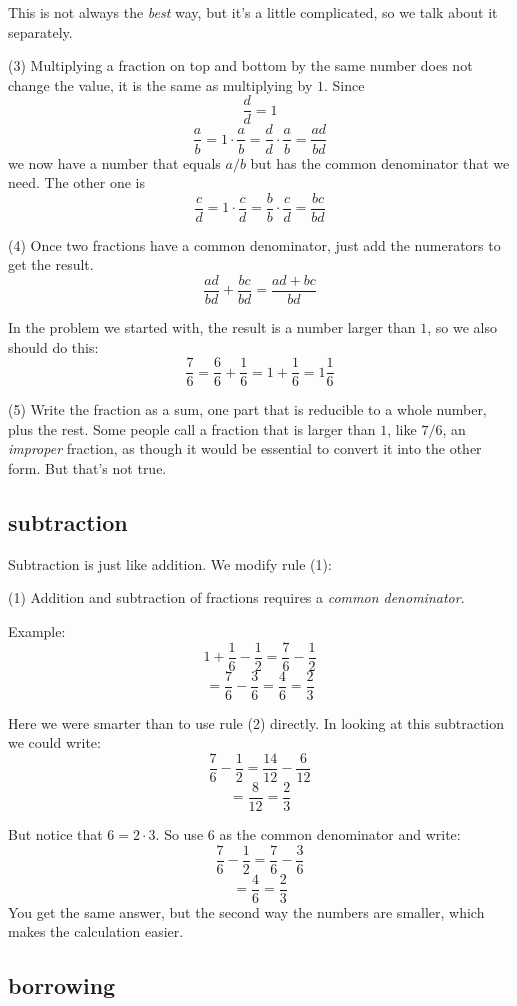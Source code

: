 \documentclass[11pt, oneside]{article}
\begin{document}
This is not always the \emph{best} way, but it's a little complicated, so we talk about it separately.

(3) Multiplying a fraction on top and bottom by the same number does not change the value, it is the same as multiplying by $1$.  Since
\[ \frac{d}{d} = 1 \]
\[ \frac{a}{b} = 1 \cdot \frac{a}{b} =\frac{d}{d} \cdot \frac{a}{b} = \frac{ad}{bd} \]
we now have a number that equals $a/b$ but has the common denominator that we need.  The other one is
\[ \frac{c}{d} = 1 \cdot \frac{c}{d} = \frac{b}{b} \cdot \frac{c}{d} = \frac{bc}{bd} \]

(4) Once two fractions have a common denominator, just add the numerators to get the result.
\[ \frac{ad}{bd} + \frac{bc}{bd} =  \frac{ad + bc}{bd} \]

In the problem we started with, the result is a number larger than $1$, so we also should do this:
\[ \frac{7}{6} = \frac{6}{6} + \frac{1}{6} = 1 + \frac{1}{6} = 1 \frac{1}{6} \]

(5) Write the fraction as a sum, one part that is reducible to a whole number, plus the rest.  Some people call a fraction that is larger than $1$, like $7/6$, an \emph{improper} fraction, as though it would be essential to convert it into the other form.  But that's not true.

\subsection*{subtraction}

Subtraction is just like addition.  We modify rule (1):

(1) Addition and subtraction of fractions requires a \emph{common denominator}.

Example:
\[ 1 + \frac{1}{6} - \frac{1}{2} = \frac{7}{6} - \frac{1}{2} \]
\[ = \frac{7}{6} - \frac{3}{6} = \frac{4}{6} = \frac{2}{3} \]

Here we were smarter than to use rule (2) directly.  In looking at this subtraction we could write:
\[ \frac{7}{6} - \frac{1}{2} = \frac{14}{12} - \frac{6}{12} \]
\[ = \frac{8}{12} = \frac{2}{3}  \]

But notice that $6 = 2 \cdot 3$.  So use $6$ as the common denominator and write:
\[ \frac{7}{6} - \frac{1}{2} = \frac{7}{6} - \frac{3}{6} \]
\[ = \frac{4}{6} = \frac{2}{3}  \]
You get the same answer, but the second way the numbers are smaller, which makes the calculation easier.

\subsection*{borrowing}
\end{document}
